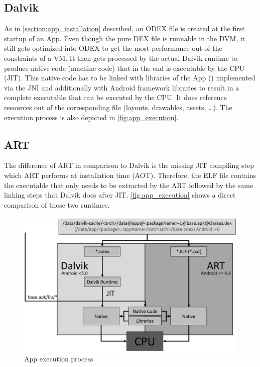 \subsection{Dalvik}
As in \autoref{section:app_installation} described, an
ODEX file is created at the first startup of an App. Even though
the pure DEX file is runnable in the DVM, it still gets optimized
into ODEX to get the most performance out of the
constraints of a VM.
It then gets processed by the actual Dalvik runtime to produce
native code (machine code) that in the end is executable by the CPU (JIT).
This native code has to be linked with libraries of the App
() implemented via the JNI
and additionally with Android framework libraries to result in a complete
executable that can be executed by the CPU. It does
reference resources out of the corresponding  file (layouts,
drawables, assets, \ldots). The execution process is also depicted
in \autoref{fig:app_execution}.

\subsection{ART}
The difference of ART in comparison to Dalvik is the missing
JIT compiling step which ART performs at installation time
(AOT). Therefore, the ELF file contains the executable that
only needs to be extracted by the ART followed by the same
linking steps that Dalvik does after JIT. \autoref{fig:app_execution}
shows a direct comparison of those two runtimes.

\begin{figure}[htb]
  \includegraphics[width=\textwidth]{figures/app_execution}
  \caption[App execution process]{App execution process}
  \label{fig:app_execution}
\end{figure}
